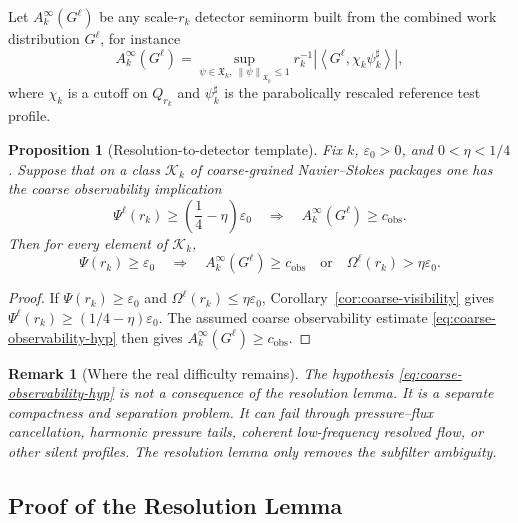 \documentclass[11pt]{article}
\numberwithin{equation}{section}
\newtheorem{proposition}[theorem]{Proposition}
\newtheorem{remark}[theorem]{Remark}
\newcommand{\eps}{\varepsilon}
\newcommand{\calK}{\mathcal K}
\newcommand{\norm}[2]{\left\lVert #1\right\rVert_{#2}}
\begin{document}
Let $A_k^\infty(G^\ell)$ be any scale-$r_k$ detector seminorm built from the combined work distribution $G^\ell$, for instance
\begin{equation}\label{eq:infinite-detector}
A_k^\infty(G^\ell)=
\sup_{\psi\in\mathfrak X_k,\ \norm{\psi}{\mathfrak X_k}\le1}
 r_k^{-1}\left|\left\langle G^\ell,\chi_k\psi_k^\sharp\right\rangle\right|,
\end{equation}
where $\chi_k$ is a cutoff on $Q_{r_k}$ and $\psi_k^\sharp$ is the parabolically rescaled reference test profile.

\begin{proposition}[Resolution-to-detector template]\label{prop:detector-template}
Fix $k$, $\eps_0>0$, and $0<\eta<1/4$.  Suppose that on a class $\calK_k$ of coarse-grained Navier--Stokes packages one has the coarse observability implication
\begin{equation}\label{eq:coarse-observability-hyp}
\Psi^\ell(r_k)\ge\left(\frac14-\eta\right)\eps_0
\quad\Longrightarrow\quad
A_k^\infty(G^\ell)\ge c_{\mathrm{obs}}.
\end{equation}
Then for every element of $\calK_k$,
\begin{equation}\label{eq:detector-dichotomy-template}
\Psi(r_k)\ge\eps_0
\quad\Longrightarrow\quad
A_k^\infty(G^\ell)\ge c_{\mathrm{obs}}
\quad\text{or}\quad
\Omega^\ell(r_k)>\eta\eps_0.
\end{equation}
\end{proposition}

\begin{proof}
If $\Psi(r_k)\ge\eps_0$ and $\Omega^\ell(r_k)\le\eta\eps_0$, Corollary~\ref{cor:coarse-visibility} gives $\Psi^\ell(r_k)\ge(1/4-\eta)\eps_0$.  The assumed coarse observability estimate \eqref{eq:coarse-observability-hyp} then gives $A_k^\infty(G^\ell)\ge c_{\mathrm{obs}}$.
\end{proof}

\begin{remark}[Where the real difficulty remains]
The hypothesis \eqref{eq:coarse-observability-hyp} is not a consequence of the resolution lemma.  It is a separate compactness and separation problem.  It can fail through pressure--flux cancellation, harmonic pressure tails, coherent low-frequency resolved flow, or other silent profiles.  The resolution lemma only removes the subfilter ambiguity.
\end{remark}
\subsection{Proof of the Resolution Lemma}
\end{document}

